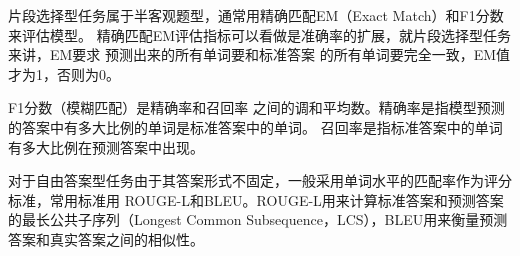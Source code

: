 片段选择型任务属于半客观题型，通常用精确匹配EM（Exact Match）和F1分数来评估模型。
精确匹配EM评估指标可以看做是准确率的扩展，就片段选择型任务来讲，EM要求
预测出来的所有单词要和标准答案
的所有单词要完全一致，EM值才为1，否则为0。

F1分数（模糊匹配）是精确率和召回率
之间的调和平均数。精确率是指模型预测的答案中有多大比例的单词是标准答案中的单词。
召回率是指标准答案中的单词有多大比例在预测答案中出现。


对于自由答案型任务由于其答案形式不固定，一般采用单词水平的匹配率作为评分标准，常用标准用
ROUGE-L和BLEU。ROUGE-L用来计算标准答案和预测答案的最长公共子序列（Longest Common Subsequence，LCS），BLEU用来衡量预测答案和真实答案之间的相似性。



